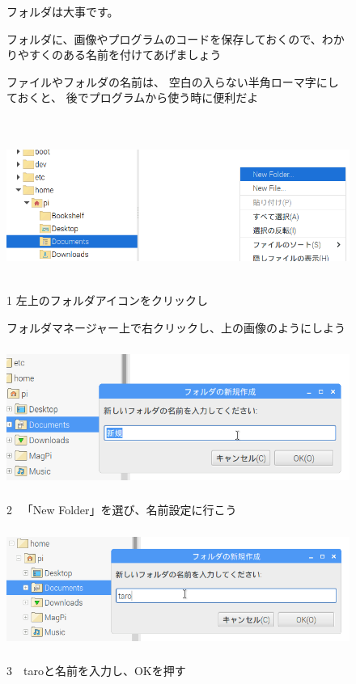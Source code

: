 \documentclass[a4paper,12pt]{jarticle}
\begin{document}
\begin{figure}[hb]
  \centering
  \begin{minipage}{0.8\textwidth}
    {	\large
      フォルダは大事です。

      フォルダに、画像やプログラムのコードを保存しておくので、わかりやすくのある名前を付けてあげましょう

      \bigskip
      ファイルやフォルダの名前は、
      空白の入らない半角ローマ字にしておくと、
      後でプログラムから使う時に便利だよ
    }
  \end{minipage}
\end{figure}
\clearpage
\begin{figure}[ht]
  \vspace{8mm}\\
  \centering
  \includegraphics[width=13.33cm,height=4.74cm]{textbook-img034.png}
  \begin{minipage}{\textwidth}
    1
    左上のフォルダアイコンをクリックし

    フォルダマネージャー上で右クリックし、上の画像のようにしよう
  \end{minipage}

  \centering
  \includegraphics[width=12.483cm,height=4.584cm]{textbook-img036.png}
  \begin{minipage}{\textwidth}
    2
    \ 「New Folder」を選び、名前設定に行こう
  \end{minipage}

  \centering
  \includegraphics[width=12.776cm,height=3.879cm]{textbook-img039.png}
  \begin{minipage}{\textwidth}
    3　taroと名前を入力し、OKを押す
  \end{minipage}


\end{figure}
\end{document}

